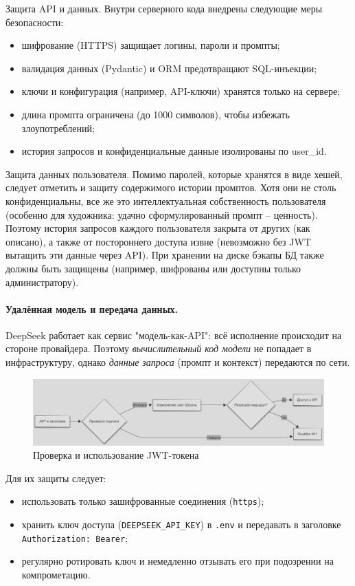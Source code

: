 Защита API и данных. Внутри серверного кода внедрены следующие меры безопасности:
\begin{itemize}
    \item шифрование (HTTPS) защищает логины, пароли и промпты;
    \item валидация данных (Pydantic) и ORM предотвращают SQL-инъекции;
    \item ключи и конфигурация (например, API-ключи) хранятся только на сервере;
    \item длина промпта ограничена (до 1000 символов), чтобы избежать злоупотреблений;
    \item история запросов и конфиденциальные данные изолированы по user\_id.
\end{itemize}

Защита данных пользователя. Помимо паролей, которые хранятся в виде хешей, следует отметить и защиту содержимого истории промптов. Хотя они не столь конфиденциальны, все же это интеллектуальная собственность пользователя (особенно для художника: удачно сформулированный промпт – ценность). Поэтому история запросов каждого пользователя закрыта от других (как описано), а также от постороннего доступа извне (невозможно без JWT вытащить эти данные через API). При хранении на диске бэкапы БД также должны быть защищены (например, шифрованы или доступны только администратору).

\paragraph{Удалённая модель и передача данных.}
DeepSeek работает как сервис "модель-как-API": всё исполнение происходит на стороне провайдера.
Поэтому \emph{вычислительный код модели} не попадает в инфраструктуру, однако
\emph{данные запроса} (промпт и контекст) передаются по сети.  


\begin{figure}[htbp]
\centering
    \includegraphics[width=1\textwidth]{picture/diploma-deffence-algo-2.png}
\caption{Проверка и использование JWT-токена}
\label{diagram_jwt}
\end{figure}
Для их защиты следует:

\begin{itemize}
  \item использовать только зашифрованные соединения (\texttt{https});
  \item хранить ключ доступа (\texttt{DEEPSEEK\_API\_KEY}) в \texttt{.env} и передавать в заголовке \texttt{Authorization: Bearer};
  \item регулярно ротировать ключ и немедленно отзывать его при подозрении на компрометацию.
\end{itemize}

